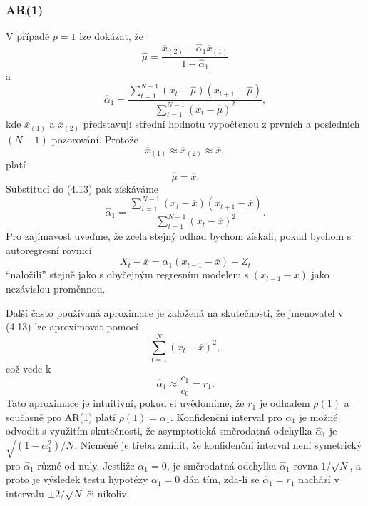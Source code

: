 \subsubsection{AR(1)}

V případě $p = 1$ lze dokázat, že
\begin{equation}
\hat{\mu} = \frac{\overline{x}_{(2)} - \hat{\alpha}_1 \overline{x}_{(1)}}{1 - \hat{\alpha}_1}
\end{equation}
a
\begin{equation}
\hat{\alpha}_1 = \frac{\sum_{t = 1}^{N - 1}(x_t - \hat{\mu})(x_{t+1} - \hat{\mu})}{\sum_{t=1}^{N-1}(x_t - \hat{\mu})^2},
\end{equation}
kde $\overline{x}_{(1)}$ a $\overline{x}_{(2)}$ představují střední hodnotu vypočtenou z prvních a posledních $(N - 1)$ pozorování. Protože
\begin{equation}
\overline{x}_{(1)} \approx \overline{x}_{(2)} \approx \overline{x},
\end{equation}
platí
\begin{equation}
\hat{\mu} = \overline{x}.
\end{equation}
Substitucí do (4.13) pak získáváme
\begin{equation}
\hat{\alpha}_1 = \frac{\sum_{t=1}^{N-1}(x_t - \overline{x})(x_{t+1} - \overline{x})}{\sum_{t = 1}^{N-1}(x_t-\overline{x})^2}.
\end{equation}
Pro zajímavost uveďme, že zcela stejný odhad bychom získali, pokud bychom s autoregresní rovnicí
\begin{equation}
X_t - \overline{x} = \alpha_1(x_{t-1} - \overline{x}) + Z_t
\end{equation}
``naložili'' stejně jako s obyčejným regresním modelem s $(x_{t-1} - \overline{x})$ jako nezávislou proměnnou.

Další často používaná aproximace je založená na skutečnosti, že jmenovatel v (4.13) lze aproximovat pomocí
\begin{equation}
\sum_{t = 1}^N (x_t - \overline{x})^2,
\end{equation}
což vede k
\begin{equation}
\hat{\alpha}_1 \approx \frac{c_1}{c_0} = r_1.
\end{equation}
Tato aproximace je intuitivní, pokud si uvědomíme, že $r_1$ je odhadem $\rho(1)$ a současně pro AR(1) platí $\rho(1) = \alpha_1$. Konfidenční interval pro $\alpha_1$ je možné odvodit s využitím skutečnosti, že asymptotická směrodatná odchylka $\hat{\alpha}_1$ je $\sqrt{(1 - \alpha_1^2)/N}$. Nicméně je třeba zmínit, že konfidenční interval není symetrický pro $\hat{\alpha}_1$ různé od nuly. Jestliže $\alpha_1 = 0$, je směrodatná odchylka $\hat{\alpha}_1$ rovna $1/ \sqrt{N}$, a proto je výsledek testu hypotézy $\alpha_1 = 0$ dán tím, zda-li se $\hat{\alpha}_1 = r_1$ nachází v intervalu $\pm 2 / \sqrt{N}$ či nikoliv.

